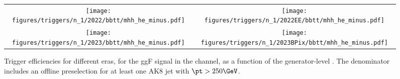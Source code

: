 
    \begin{figure}[H]
        \centering
        \begin{tabular}{cc}
            \texttt{[image: figures/triggers/n\_1/2022/bbtt/mhh\_he\_minus.pdf]} &
            \texttt{[image: figures/triggers/n\_1/2022EE/bbtt/mhh\_he\_minus.pdf]} \\[1ex]
            \texttt{[image: figures/triggers/n\_1/2023/bbtt/mhh\_he\_minus.pdf]} &
            \texttt{[image: figures/triggers/n\_1/2023BPix/bbtt/mhh\_he\_minus.pdf]}
            \label{fig}
        \end{tabular}
\caption{Trigger efficiencies for different eras, for the ggF \HHbbtt signal in the \tauhe channel, as a function of the generator-level \mHH. The denominator includes an offline preselection for at least one AK8 jet with $\pt > 250\GeV$.}
\label{fig:triggers_n-1_bbtt_he_mhh}
\end{figure}
